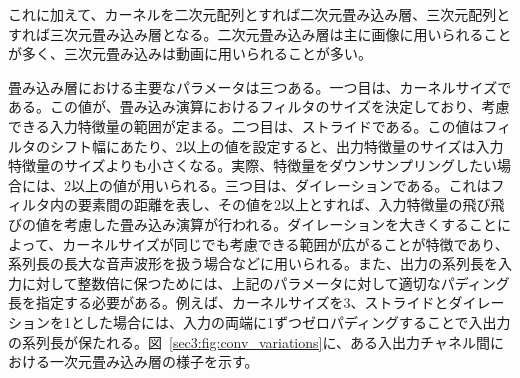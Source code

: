 \documentclass[12pt]{jarticle}
\numberwithin{equation}{section}    %
\numberwithin{figure}{section}      %
\numberwithin{table}{section}      %
\begin{document}
これに加えて、カーネルを二次元配列とすれば二次元畳み込み層、三次元配列とすれば三次元畳み込み層となる。二次元畳み込み層は主に画像に用いられることが多く、三次元畳み込みは動画に用いられることが多い。

畳み込み層における主要なパラメータは三つある。一つ目は、カーネルサイズである。この値が、畳み込み演算におけるフィルタのサイズを決定しており、考慮できる入力特徴量の範囲が定まる。二つ目は、ストライドである。この値はフィルタのシフト幅にあたり、2以上の値を設定すると、出力特徴量のサイズは入力特徴量のサイズよりも小さくなる。実際、特徴量をダウンサンプリングしたい場合には、2以上の値が用いられる。三つ目は、ダイレーションである。これはフィルタ内の要素間の距離を表し、その値を2以上とすれば、入力特徴量の飛び飛びの値を考慮した畳み込み演算が行われる。ダイレーションを大きくすることによって、カーネルサイズが同じでも考慮できる範囲が広がることが特徴であり、系列長の長大な音声波形を扱う場合などに用いられる。また、出力の系列長を入力に対して整数倍に保つためには、上記のパラメータに対して適切なパディング長を指定する必要がある。例えば、カーネルサイズを3、ストライドとダイレーションを1とした場合には、入力の両端に1ずつゼロパディングすることで入出力の系列長が保たれる。図~\ref{sec3:fig:conv_variations}に、ある入出力チャネル間における一次元畳み込み層の様子を示す。
\end{document}
